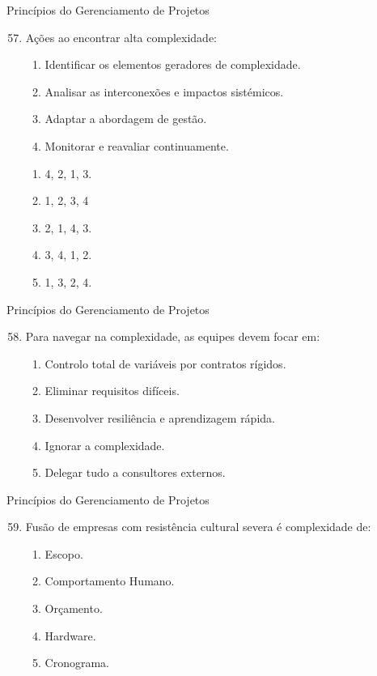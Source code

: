 \documentclass{beamer}
\begin{document}
\begin{frame}{Princípios do Gerenciamento de Projetos}
	\begin{enumerate}
		\setcounter{enumi}{56}
		\justifying
		\item Ações ao encontrar alta complexidade:
		\begin{enumerate}[I]
			\item Identificar os elementos geradores de complexidade.
			\item Analisar as interconexões e impactos sistémicos.
			\item Adaptar a abordagem de gestão.
			\item Monitorar e reavaliar continuamente.
		\end{enumerate}
		\begin{enumerate}[a]
			\item 4, 2, 1, 3.
			\item \alert<2>{1, 2, 3, 4}
			\item 2, 1, 4, 3.
			\item 3, 4, 1, 2.
			\item 1, 3, 2, 4.
		\end{enumerate}
	\end{enumerate}
\end{frame}

\begin{frame}{Princípios do Gerenciamento de Projetos}
	\begin{enumerate}
		\setcounter{enumi}{57}
		\justifying
		\item Para navegar na complexidade, as equipes devem focar em:
		\begin{enumerate}[a]
			\item Controlo total de variáveis por contratos rígidos.
			\item Eliminar requisitos difíceis.
			\item \alert<2>{Desenvolver resiliência e aprendizagem rápida.}
			\item Ignorar a complexidade.
			\item Delegar tudo a consultores externos.
		\end{enumerate}
	\end{enumerate}
\end{frame}

\begin{frame}{Princípios do Gerenciamento de Projetos}
	\begin{enumerate}
		\setcounter{enumi}{58}
		\justifying
		\item Fusão de empresas com resistência cultural severa é complexidade de:
		\begin{enumerate}[a]
			\item Escopo.
			\item \alert<2>{Comportamento Humano.}
			\item Orçamento.
			\item Hardware.
			\item Cronograma.
		\end{enumerate}
	\end{enumerate}
\end{frame}
\end{document}
